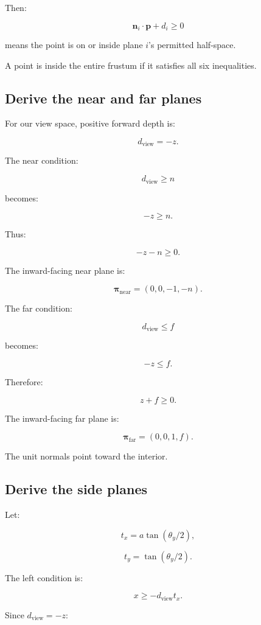 Then:

\[
 \boxed{ \mathbf n_i\cdot\mathbf p+d_i\ge0 }
\]

means the point is on or inside plane \(i\)'s permitted half-space.

A point is inside the entire frustum if it satisfies all six inequalities.

\subsection{Derive the near and far planes}\label{02-foundations-ii-ch034-derive-the-near-and-far-planes}

For our view space, positive forward depth is:

\[
 d_{\mathrm{view}}=-z.
\]

The near condition:

\[
 d_{\mathrm{view}}\ge n
\]

becomes:

\[
 -z\ge n.
\]

Thus:

\[
 \boxed{ -z-n\ge0 }.
\]

The inward-facing near plane is:

\[
 \boxed{ \boldsymbol\pi_{\mathrm{near}}=(0,0,-1,-n) }.
\]

The far condition:

\[
 d_{\mathrm{view}}\le f
\]

becomes:

\[
 -z\le f.
\]

Therefore:

\[
 \boxed{ z+f\ge0 }.
\]

The inward-facing far plane is:

\[
 \boxed{ \boldsymbol\pi_{\mathrm{far}}=(0,0,1,f) }.
\]

The unit normals point toward the interior.

\subsection{Derive the side planes}\label{02-foundations-ii-ch034-derive-the-side-planes}

Let:

\[
 t_x=a\tan(\theta_y/2),
\]

\[
 t_y=\tan(\theta_y/2).
\]

The left condition is:

\[
 x\ge-d_{\mathrm{view}}t_x.
\]

Since \(d_{\mathrm{view}}=-z\):

